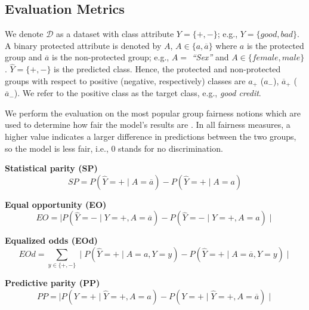 \documentclass[runningheads]{llncs}
\begin{document}
\subsection{Evaluation Metrics}
\label{sec:metrics}

We denote $\mathcal{D}$ as a dataset with class attribute $Y = \{+, -\}$; e.g., $Y = \{good, bad\}$. A binary protected attribute is denoted by $A$, $A \in \{a,\overline{a}\}$ where $a$ is the protected group and $\overline{a}$ is the non-protected group; e.g., $A = $ \emph{``Sex''} and $A \in \{female, male\}$.  $\hat{Y} = \{+, -\}$ is the predicted class. Hence, the protected and non-protected groups with respect to positive (negative, respectively) classes are $a_{+}$ ($a_{-}$), $\overline{a}_{+}$ ($\overline{a}_{-}$). We refer to the positive class as the target class, e.g., \textit{good credit}. 

We perform the evaluation on the most popular group fairness notions which are used to determine how fair the model's results are \cite{le2022evaluation}. %
In all fairness measures, a higher value indicates a larger difference in predictions between the two groups, so the model is less fair, i.e., 0 stands for no discrimination.

\textbf{Statistical parity (SP)}
\begin{equation}
\label{eq:statistical_parity}
    SP =  P(\hat{Y}=+ \mid A=\overline{a}) - P(\hat{Y}=+ \mid A=a)    
\end{equation}

\textbf{Equal opportunity (EO)}
\label{eq:equal_opportunity}
\begin{equation}
    EO =\mid P(\hat{Y} = - \mid Y = +, A = \overline{a}) - P(\hat{Y} = - \mid Y = +, A=a)\mid
\end{equation}  

\textbf{Equalized odds (EOd)}
\begin{equation}
\label{eq:equalized_odds}
EOd = \sum_{y\in \{+,-\}}\mid P(\hat{Y}=+ \mid A=a,Y=y) - P(\hat{Y}=+\mid A=\overline{a},Y=y)\mid
\end{equation}

\textbf{Predictive parity (PP)}
\begin{equation}
\label{eq:predictive_parity}
    PP = \mid P(Y = + \mid \hat{Y} = +, A = a) - P(Y = + \mid\hat{Y} = +, A = \overline{a})\mid
\end{equation}
\end{document}
